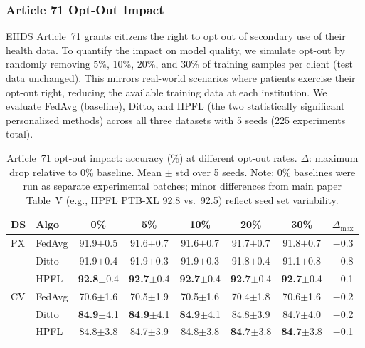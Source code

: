 \documentclass[conference]{IEEEtran}
\begin{document}
\subsubsection{Article 71 Opt-Out Impact}
\label{sec:optout}

EHDS Article~71 grants citizens the right to opt out of secondary use of their health data. To quantify the impact on model quality, we simulate opt-out by randomly removing 5\%, 10\%, 20\%, and 30\% of training samples per client (test data unchanged). This mirrors real-world scenarios where patients exercise their opt-out right, reducing the available training data at each institution. We evaluate FedAvg (baseline), Ditto, and HPFL (the two statistically significant personalized methods) across all three datasets with 5 seeds (225 experiments total).

\begin{table}[t]
\centering
\caption{Article~71 opt-out impact: accuracy (\%) at different opt-out rates. $\Delta$: maximum drop relative to 0\% baseline. Mean $\pm$ std over 5 seeds. Note: 0\% baselines were run as separate experimental batches; minor differences from main paper Table~V (e.g., HPFL PTB-XL 92.8 vs.\ 92.5) reflect seed set variability.}
\label{tab:optout}
\footnotesize
\begin{tabular}{ll ccccc c}
\toprule
\textbf{DS} & \textbf{Algo} & \textbf{0\%} & \textbf{5\%} & \textbf{10\%} & \textbf{20\%} & \textbf{30\%} & $\Delta_{\max}$ \\
\midrule
PX & FedAvg & 91.9{\tiny$\pm$0.5} & 91.6{\tiny$\pm$0.7} & 91.6{\tiny$\pm$0.7} & 91.7{\tiny$\pm$0.7} & 91.8{\tiny$\pm$0.7} & $-$0.3 \\
 & Ditto & 91.9{\tiny$\pm$0.4} & 91.9{\tiny$\pm$0.3} & 91.9{\tiny$\pm$0.3} & 91.8{\tiny$\pm$0.4} & 91.1{\tiny$\pm$0.8} & $-$0.8 \\
 & HPFL & \textbf{92.8}{\tiny$\pm$0.4} & \textbf{92.7}{\tiny$\pm$0.4} & \textbf{92.7}{\tiny$\pm$0.4} & \textbf{92.7}{\tiny$\pm$0.4} & \textbf{92.7}{\tiny$\pm$0.4} & $-$0.1 \\
\midrule
CV & FedAvg & 70.6{\tiny$\pm$1.6} & 70.5{\tiny$\pm$1.9} & 70.5{\tiny$\pm$1.6} & 70.4{\tiny$\pm$1.8} & 70.6{\tiny$\pm$1.6} & $-$0.2 \\
 & Ditto & \textbf{84.9}{\tiny$\pm$4.1} & \textbf{84.9}{\tiny$\pm$4.1} & \textbf{84.9}{\tiny$\pm$4.1} & 84.8{\tiny$\pm$3.9} & 84.7{\tiny$\pm$4.0} & $-$0.2 \\
 & HPFL & 84.8{\tiny$\pm$3.8} & 84.7{\tiny$\pm$3.9} & 84.8{\tiny$\pm$3.8} & \textbf{84.7}{\tiny$\pm$3.8} & \textbf{84.7}{\tiny$\pm$3.8} & $-$0.1 \\

\end{tabular}
\end{table}
\end{document}

